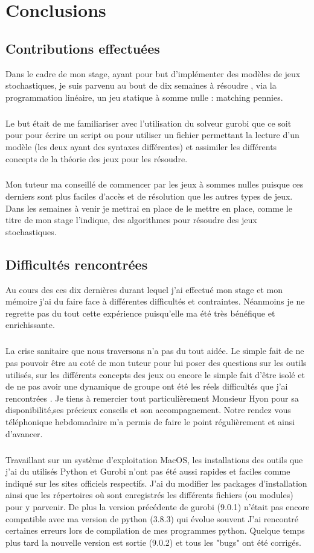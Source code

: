 \documentclass[a4paper, 12pt, twoside]{article}
\begin{document}
{{{{{\section{Conclusions}
\subsection{Contributions effectuées}
Dans le cadre de mon stage, ayant pour but d'implémenter des modèles de jeux stochastiques, je suis parvenu au bout de dix semaines à résoudre , via la programmation linéaire, un jeu statique à somme nulle : \textsf{matching pennies}. 

\subparagraph*{}{Le but était de me familiariser avec l'utilisation du solveur \textsf{gurobi} que ce soit pour pour écrire un script ou pour utiliser un fichier permettant la lecture d'un modèle (les deux ayant des syntaxes différentes) et assimiler les différents concepts de la \textsf{théorie des jeux} pour les résoudre.}

\subparagraph*{}{Mon tuteur ma conseillé de commencer par les \textsf{jeux à sommes nulles} puisque ces derniers sont plus faciles d'accès et de résolution que les autres types de jeux. Dans les semaines à venir je mettrai en  place de le mettre en place, comme le titre de mon stage l'indique, des algorithmes pour résoudre des \textsf{jeux stochastiques}.}

\subsection{Difficultés rencontrées}
Au cours des ces dix dernières durant lequel j'ai effectué mon stage et mon mémoire j'ai du faire face à différentes difficultés et contraintes. Néanmoins je ne regrette pas du tout cette expérience puisqu'elle ma été très bénéfique et enrichissante. 

\subparagraph*{}{La crise sanitaire que nous traversons n'a pas du tout aidée. Le simple fait de ne pas pouvoir être au coté de mon tuteur pour lui poser des questions sur les outils utilisés, sur les différents concepts des \textsf{jeux} ou encore le simple fait d'être isolé et de ne pas avoir une dynamique de groupe ont été les réels difficultés que j'ai rencontrées . Je tiens à remercier tout particulièrement Monsieur \textsf{Hyon} pour sa disponibilité,ses précieux conseils et son accompagnement. Notre rendez vous téléphonique hebdomadaire m'a permis de faire le point régulièrement et ainsi d'avancer.}

\subparagraph*{}{Travaillant sur un système d'exploitation MacOS, les installations des  outils que j'ai du utilisés \textsf{Python et  Gurobi} n'ont pas été aussi rapides et faciles comme indiqué sur les sites officiels respectifs. J'ai du modifier les packages d'installation ainsi que les répertoires où sont enregistrés les différents fichiers (ou modules) pour y parvenir. De plus la version précédente de \textsf{gurobi} (9.0.1) n'était pas encore compatible avec ma version de \textsf{python} (3.8.3) qui évolue souvent  J'ai rencontré certaines erreurs lors de compilation de mes programmes python. Quelque temps plus tard la nouvelle version est sortie (9.0.2) et tous les "bugs" ont été corrigés. }

}}}}}
\end{document}
